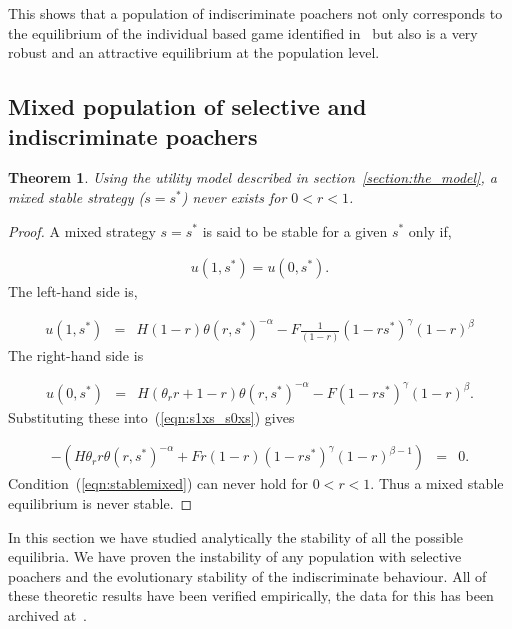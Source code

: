 \documentclass[10pt]{article}
\newtheorem{theorem}{Theorem}
\begin{document}
This shows that a population of indiscriminate poachers 
not only corresponds to the equilibrium of the individual based 
game identified in~\cite{Lee} but also is a very robust and an attractive 
equilibrium at the population level.

\subsection{Mixed population of selective and indiscriminate poachers}

\begin{theorem}\label{theorem:mixed}
Using the utility model described in section~\ref{section:the_model}, a mixed
stable strategy (\(s=s^*\)) never exists for \(0 < r <1\).  
\end{theorem}

\begin{proof}
    A mixed strategy \(s = s^*\) is said to be stable for a
    given \(s^*\) only if,

    \begin{eqnarray}
    \label{eqn:s1xs_s0xs}
    u(1,s^*) = u(0,s^*).
    \end{eqnarray}
    The left-hand side is,

    \begin{eqnarray} \nonumber
    u(1,s^*)&=&
    H(1 - r) \theta(r, s^*)^{-\alpha} - F \frac{1}{(1 - r)}(1 - rs^*)^{\gamma}(1 - r)^{\beta} 
    \end{eqnarray}
    The right-hand side is

    \begin{eqnarray} \nonumber
    u(0,s^*)&=&
    H(\theta_rr + 1 - r)\theta(r, s^*)^{-\alpha} - F(1 - rs^*)^{\gamma}(1 - r)^{\beta} .      
    \end{eqnarray}
    Substituting these into~(\ref{eqn:s1xs_s0xs}) gives

    \begin{eqnarray}
    \label{eqn:stablemixed}
            - (H \theta_r r \theta(r, s^*)^{-\alpha}  + F  r{(1 - r)} (1 - rs^*)^{\gamma}(1 - r)^{\beta - 1})&=& 0.
            \end{eqnarray}
    Condition~(\ref{eqn:stablemixed}) can never hold for \(0 < r <1\).
    Thus a mixed stable equilibrium is never stable.
\end{proof}

In this section we have studied analytically the stability of all the possible
equilibria. We have proven the instability of any population with selective
poachers
and the evolutionary stability of the indiscriminate behaviour. 
All of these theoretic results have been verified empirically, the data for this
has been archived at~\cite{}.
\end{document}
